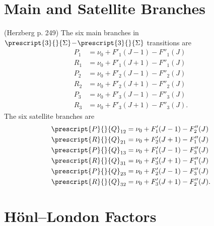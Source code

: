 \documentclass[11pt, twoside, fleqn]{report}
\newcommand{\dash}{\!-\!}
\newcommand{\state}[2]{\prescript{#1}{}{#2}}
\begin{document}
\section{Main and Satellite Branches}

 (Herzberg p. 249) The six main branches in $\state{3}{\Sigma}\dash\state{3}{\Sigma}$ transitions are
\begin{align*}
    P_{1} & = \nu_{0} + F'_{1}(J - 1) - F''_{1}(J)  \\
    R_{1} & = \nu_{0} + F'_{1}(J + 1) - F''_{1}(J)  \\
    P_{2} & = \nu_{0} + F'_{2}(J - 1) - F''_{2}(J)  \\
    R_{2} & = \nu_{0} + F'_{2}(J + 1) - F''_{2}(J)  \\
    P_{3} & = \nu_{0} + F'_{3}(J - 1) - F''_{3}(J)  \\
    R_{3} & = \nu_{0} + F'_{3}(J + 1) - F''_{3}(J).
\end{align*}
The six satellite branches are
\begin{align*}
    \state{P}{Q}_{12} & = \nu_{0} + F'_{1}(J - 1) - F''_{2}(J)  \\
    \state{R}{Q}_{21} & = \nu_{0} + F'_{2}(J + 1) - F''_{1}(J)  \\
    \state{P}{Q}_{13} & = \nu_{0} + F'_{1}(J - 1) - F''_{3}(J)  \\
    \state{R}{Q}_{31} & = \nu_{0} + F'_{3}(J + 1) - F''_{1}(J)  \\
    \state{P}{Q}_{23} & = \nu_{0} + F'_{2}(J - 1) - F''_{3}(J)  \\
    \state{R}{Q}_{32} & = \nu_{0} + F'_{3}(J + 1) - F''_{2}(J).
\end{align*}

\section{H\"onl--London Factors}
\end{document}
